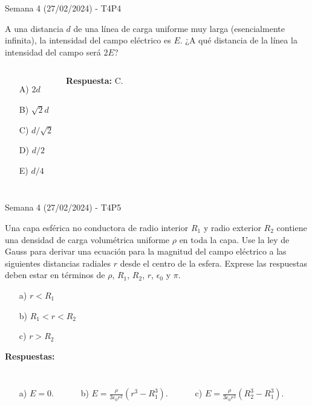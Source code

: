 \begin{frame}{Semana 4 (27/02/2024) - T4P4}
    
    A una distancia $d$ de una línea de carga uniforme muy larga (esencialmente infinita), la intensidad del campo eléctrico es $E$. ¿A qué distancia de la línea la intensidad del campo será $2E$?
    
    \begin{columns}
    \begin{itemize}
        \item[A)] $2d$
        \item[B)] $\sqrt{2}d$
        \item[C)] $d/\sqrt{2}$
        \item[D)] $d/2$
        \item[E)] $d/4$
    \end{itemize}
    \pause\centering\textbf{Respuesta:} C.
    \end{columns}
    
\end{frame}

\begin{frame}{Semana 4 (27/02/2024) - T4P5}
    
    Una capa esférica no conductora de radio interior $R_1$ y radio exterior $R_2$ contiene una densidad de carga volum\'etrica uniforme $\rho$ en toda la capa. Use la ley de Gauss para derivar una ecuación para la magnitud del campo eléctrico a las siguientes distancias radiales $r$ desde el centro de la esfera. Exprese las respuestas deben estar en términos de $\rho$, $R_1$, $R_2$, $r$, $\epsilon_0$ y $\pi$.
    
    \begin{itemize}
        \item[a)] $r<R_1$
        \item[b)] $R_1<r<R_2$
        \item[c)] $r>R_2$
    \end{itemize}
    
    \pause\textbf{Respuestas:} 
    \begin{columns}
    \begin{itemize}
        \item[a)] $E=0$.
    \end{itemize}
    \begin{itemize}
        \item[b)] $E=\frac{\rho}{3\epsilon_0 r^2}\left(r^3-R_1^3\right)$.
    \end{itemize}
    \begin{itemize}
        \item[c)] $E=\frac{\rho}{3\epsilon_0 r^2}\left(R_2^3-R_1^3\right)$.
    \end{itemize}
    \end{columns}
    
\end{frame}

